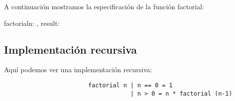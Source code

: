 \documentclass{article}
\begin{document}
                    A continuación mostramos la especificación de la función factorial:\\
                    
                    \begin{proc}{factorial}{\In n: \ent, \Out result: \ent}{}
                    \end{proc}
                \subsection{Implementación recursiva}
        
                    Aquí podemos ver una implementación recursiva:
        
                    \begin{verbatim}
                        factorial n | n == 0 = 1
                                    | n > 0 = n * factorial (n-1)
                    \end{verbatim}
    
    
\end{document}
